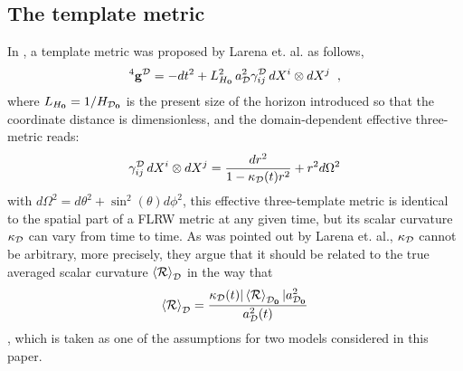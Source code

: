 \documentclass[preprint,preprintnumbers, prd, floatfix,  superscriptaddress,nofootinbib] {revtex4-1}
\newcommand{\CD}{{\cal D}}
\newcommand{\CR}{{\cal R}}
\newcommand{\average}[1]{\left\langle #1 \right\rangle_\CD}
\newcommand{\naverage}[1]{\left\langle #1 \right\rangle_{\CD_{\rm \bf 0}}}
\newcommand{\now}[1]{{#1_{\rm \bf 0}}}
\begin{document}
\subsection{The template metric}
In \cite{larena2009testing}, a template metric was proposed by Larena et. al. as follows,
\begin{equation}
\label{eq:tempmetric1}
{}^4 {\bf g}^\CD = -dt^2 + L_{\now H}^2 \,a_\CD^2 \gamma^\CD_{ij}\,dX^i \otimes dX^j \;\;,
\end{equation}
where $L_{\now H}=1/H_{\now\CD}$ is the present size of the horizon introduced so that the coordinate distance is dimensionless,
and the domain-dependent effective three-metric reads:
\begin{equation}
\gamma^\CD_{ij}\,dX^i \otimes dX^j =\frac{dr^2}{1-\kappa_{\CD}(t)r^2}+r^2d\Omega^{2}
\end{equation}
with $d\Omega^{2}=d\theta^{2}+\sin^{2}(\theta)d\phi^2$, this effective three-template metric is identical to the spatial part of a FLRW metric at any given time, but its scalar curvature  $\kappa_{\CD}$  can vary from time to time. As was pointed out by Larena et. al., $\kappa_{\CD}$ cannot be arbitrary, more precisely, they argue that it should be related to the true averaged scalar curvature $\average{\CR}$ in the way that
\begin{equation}
\average{\CR}=\frac{\kappa_{\CD}(t)|\naverage{\CR}|a_{\now\CD}^{2}}{a_{\CD}^{2}(t)}
\end{equation}
, which is taken as one of the assumptions for two models considered in this paper.
\end{document}
